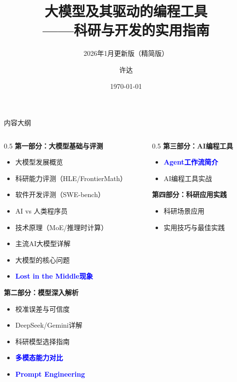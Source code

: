 \documentclass[aspectratio=169,11pt]{beamer}
\title[AI大模型与编程工具]{大模型及其驱动的编程工具\\——科研与开发的实用指南}
\subtitle{2026年1月更新版（精简版）}
\author{许达}
\institute{未来院三室}
\date{\today}
\begin{document}
\begin{frame}
    \titlepage
\end{frame}

\begin{frame}{内容大纲}
    \small
    \begin{columns}[T]
        \begin{column}{0.5\textwidth}
            \textbf{第一部分：大模型基础与评测}
            \begin{itemize}
                \item 大模型发展概览
                \item 科研能力评测（HLE/FrontierMath）
                \item 软件开发评测（SWE-bench）
                \item AI vs 人类程序员
                \item 技术原理（MoE/推理时计算）
                \item 主流AI大模型详解
                \item 大模型的核心问题
                \item \textcolor{blue}{\textbf{Lost in the Middle现象}}
            \end{itemize}
            
            \textbf{第二部分：模型深入解析}
            \begin{itemize}
                \item 校准误差与可信度
                \item DeepSeek/Gemini详解
                \item 科研模型选择指南
                \item \textcolor{blue}{\textbf{多模态能力对比}}
                \item \textcolor{blue}{\textbf{Prompt Engineering}}
            \end{itemize}
        \end{column}
        \begin{column}{0.5\textwidth}
            \textbf{第三部分：AI编程工具}
            \begin{itemize}
                \item \textcolor{blue}{\textbf{Agent工作流简介}}
                \item AI编程工具实战
            \end{itemize}
            
            \textbf{第四部分：科研应用实践}
            \begin{itemize}
                \item 科研场景应用
                \item 实用技巧与最佳实践
            \end{itemize}
            

\end{column}
\end{columns}
\end{frame}
\end{document}
